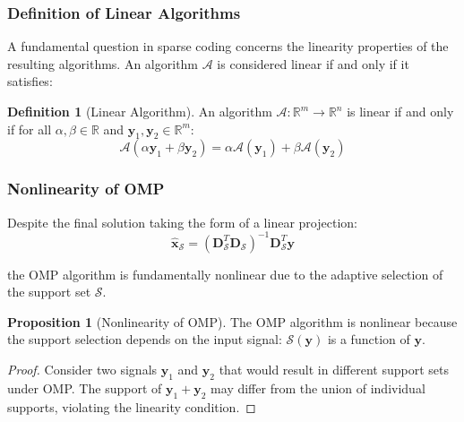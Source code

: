 \documentclass[12pt]{article}
\renewcommand{\vec}[1]{\mathbf{#1}}
\newcommand{\Real}{\mathbb{R}}
\theoremstyle{definition}
\newtheorem{proposition}[theorem]{Proposition}
\newtheorem{definition}[theorem]{Definition}
\begin{document}
\subsubsection{Definition of Linear Algorithms}

A fundamental question in sparse coding concerns the linearity properties of the resulting algorithms. An algorithm $\mathcal{A}$ is considered linear if and only if it satisfies:

\begin{definition}[Linear Algorithm]
    \label{def:linear_algorithm}
    An algorithm $\mathcal{A}: \Real^m \to \Real^n$ is linear if and only if for all $\alpha, \beta \in \Real$ and $\vec{y}_1, \vec{y}_2 \in \Real^m$:
    \begin{equation}
        \mathcal{A}(\alpha \vec{y}_1 + \beta \vec{y}_2) = \alpha \mathcal{A}(\vec{y}_1) + \beta \mathcal{A}(\vec{y}_2)
    \end{equation}
\end{definition}

\subsubsection{Nonlinearity of OMP}

Despite the final solution taking the form of a linear projection:
\begin{equation}
    \hat{\vec{x}}_{\mathcal{S}} = (\mathbf{D}_{\mathcal{S}}^T \mathbf{D}_{\mathcal{S}})^{-1} \mathbf{D}_{\mathcal{S}}^T \vec{y}
\end{equation}

the OMP algorithm is fundamentally nonlinear due to the adaptive selection of the support set $\mathcal{S}$.

\begin{proposition}[Nonlinearity of OMP]
    \label{prop:omp_nonlinear}
    The OMP algorithm is nonlinear because the support selection depends on the input signal: $\mathcal{S}(\vec{y})$ is a function of $\vec{y}$.
\end{proposition}

\begin{proof}
    Consider two signals $\vec{y}_1$ and $\vec{y}_2$ that would result in different support sets under OMP. The support of $\vec{y}_1 + \vec{y}_2$ may differ from the union of individual supports, violating the linearity condition.
\end{proof}

\end{document}
